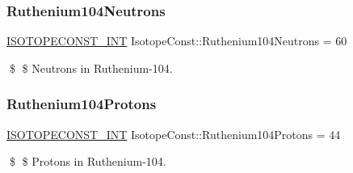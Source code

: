 \subsubsection{\texorpdfstring{Ruthenium104\+Neutrons}{Ruthenium104Neutrons}}
{\footnotesize\ttfamily \mbox{\hyperlink{group___isotope_const-_macros_ga5f18360b3e99483a35c32d789e62621c}{I\+S\+O\+T\+O\+P\+E\+C\+O\+N\+S\+T\+\_\+\+I\+NT}} Isotope\+Const\+::\+Ruthenium104\+Neutrons = 60}

\$ \$ Neutrons in Ruthenium-\/104. \mbox{\label{group___isotope_const-_ruthenium-_ru104_gae25937feedf29162c135adbff67fa4ce}} 
\subsubsection{\texorpdfstring{Ruthenium104\+Protons}{Ruthenium104Protons}}
{\footnotesize\ttfamily \mbox{\hyperlink{group___isotope_const-_macros_ga5f18360b3e99483a35c32d789e62621c}{I\+S\+O\+T\+O\+P\+E\+C\+O\+N\+S\+T\+\_\+\+I\+NT}} Isotope\+Const\+::\+Ruthenium104\+Protons = 44}

\$ \$ Protons in Ruthenium-\/104. 